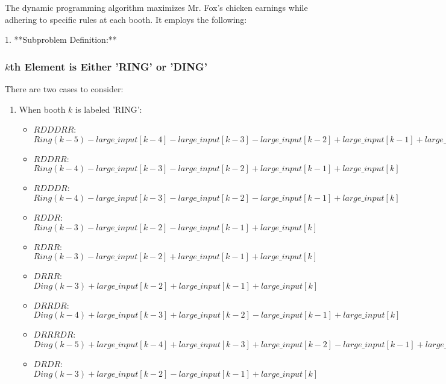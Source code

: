 \documentclass{article}
\begin{document}
The dynamic programming algorithm maximizes Mr. Fox's chicken earnings while adhering to specific rules at each booth. It employs the following:

1. **Subproblem Definition:**

    \subsubsection{\(k\)th Element is Either 'RING' or 'DING'}
There are two cases to consider:
\begin{enumerate}
    \item When booth \(k\) is labeled 'RING':
    \begin{itemize}
    \item \(RDDDRR\): \(Ring(k-5) - large\_input[k-4] - large\_input[k-3] - large\_input[k-2] + large\_input[k-1] + large\_input[k]\)
    \item \(RDDRR\): \(Ring(k-4) - large\_input[k-3] - large\_input[k-2] + large\_input[k-1] + large\_input[k]\)
    \item \(RDDDR\): \(Ring(k-4) - large\_input[k-3] - large\_input[k-2] - large\_input[k-1] + large\_input[k]\)
    \item \(RDDR\): \(Ring(k-3) - large\_input[k-2] - large\_input[k-1] + large\_input[k]\)
    \item \(RDRR\): \(Ring(k-3) - large\_input[k-2] + large\_input[k-1] + large\_input[k]\)
    \item \(DRRR\): \(Ding(k-3) + large\_input[k-2] + large\_input[k-1] + large\_input[k]\)
    \item \(DRRDR\): \(Ding(k-4) + large\_input[k-3] + large\_input[k-2] - large\_input[k-1] + large\_input[k]\)
    \item \(DRRRDR\): \(Ding(k-5) + large\_input[k-4] + large\_input[k-3] + large\_input[k-2] - large\_input[k-1] + large\_input[k]\)
    \item \(DRDR\): \(Ding(k-3) + large\_input[k-2] - large\_input[k-1] + large\_input[k]\)
\end{itemize}



\end{enumerate}
\end{document}
